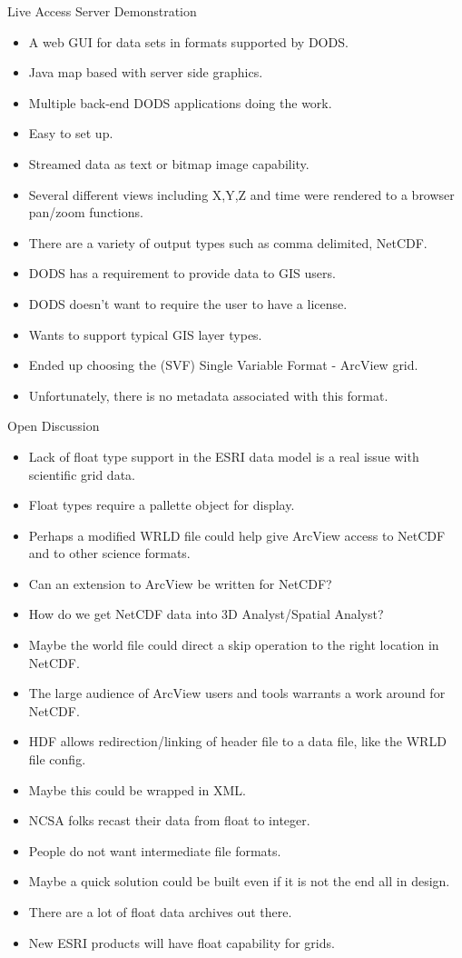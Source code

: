 Live Access Server Demonstration

\begin{itemize}
\item A web GUI for data sets in formats supported by DODS.
\item Java map based with server side graphics.
\item Multiple back-end DODS applications doing the work.
\item Easy to set up.
\item Streamed data as text or bitmap image capability.
\item Several different views including X,Y,Z and time were rendered to a browser
        pan/zoom functions.
\item There are a variety of output types such as comma delimited, NetCDF.
\item DODS has a requirement to provide data to GIS users.
\item DODS doesn't want to require the user to have a license.
\item Wants to support typical GIS layer types.
\item Ended up choosing the (SVF) Single Variable Format - ArcView grid.
\item Unfortunately, there is no metadata associated with this format.
\end{itemize}

        Open Discussion

\begin{itemize}
\item Lack of float type support in the ESRI data model is a real issue with scientific grid data.
\item Float types require a pallette object for display.
\item Perhaps a modified WRLD file could help give ArcView access to NetCDF and to other 
science formats.
\item Can an extension to ArcView be written for NetCDF?
\item How do we get NetCDF data into 3D Analyst/Spatial Analyst?
\item Maybe the world file could direct a skip operation to the right location in NetCDF.
\item The large audience of ArcView users and tools warrants a work around for NetCDF.
\item HDF allows redirection/linking of header file to a data file, like the WRLD file config.
\item Maybe this could be wrapped in XML.
\item NCSA folks recast their data from float to integer.
\item People do not want intermediate file formats.
\item Maybe a quick solution could be built even if it is not the end all in design.
\item There are a lot of float data archives out there.
\item New ESRI products will have float capability for grids.
\end{itemize}

